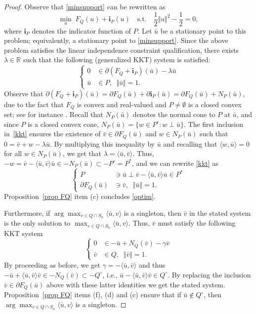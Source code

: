 \documentclass[hidelinks,onefignum,onetabnum]{siamart250211}
\theoremstyle{definition}
\theoremstyle{remark}
\newcommand{\R}{\mathbb R}
\newcommand{\bu}{\bar{u}}
\newcommand{\inner}[2]{\langle#1,#2\rangle}
\newcommand{\ind}{\mathbf{i}}
\newcommand{\norm}[1]{\textstyle{\Vert} #1 \textstyle{\Vert}}
\begin{document}
\begin{proof}
 Observe that \eqref{minsupport} can be rewritten as
\[
\min_{u } \; F_Q(u) + \ind_P(u) \quad \mbox{s.t.}\quad \frac{1}{2 }\norm{u}^2 -\displaystyle \frac{1}{2} =0,
\]
where $\ind_P$ denotes the indicator function of $P$. Let $\bu$ be a stationary point to this problem; equivalently, a stationary point to \eqref{minsupport}. Since the above problem satisfies the  linear independence constraint qualification, 
there exists $\lambda\in\R$ such that the following (generalized KKT) system is satisfied:
\begin{equation}\label{kkt}
\left\{
\begin{array}{llll}
0 & \in \partial (F_Q + \ind_P)(\bar u) - \lambda \bar u\\
\bar u & \in P,\;\; \norm{\bar u} =1.
\end{array}
\right.
\end{equation}
Observe that 
$\partial (  F_Q +\ind_P)( \bu) = \partial  F_Q(\bu) +\partial \ind_P( \bu) = \partial  F_Q(\bu) +N_P( \bu),$
due to the fact that $F_Q$ is convex and real-valued and $P\neq \emptyset$ is a closed convex set; see for instance  \cite[Corollaries 2.6 and 2.7]{WWBook}. Recall that $N_P(\bu)$ denotes the normal cone to $P$ at $\bu$, and since $P$ is a closed convex cone, $N_P( \bar u)=\{w \in P^\circ: w\perp \bar u\}$.
The first inclusion in~\eqref{kkt} ensures the existence of $\bar v \in \partial F_Q(\bar u)$ and $w \in N_P(\bar u)$ such that 
$0=\bar v + w -\lambda \bar u$. By multiplying this inequality by $\bar u$ and recalling that $\inner{w}{\bar u}=0$ for all $w \in N_P(\bar u)$, we get that $\lambda = \inner{\bar u}{\bar v}$. Thus, $-w=\bar v - \inner{\bar u}{\bar v} \bar u \in -N_P(\bar u)\subset - P^\circ = P^*$, and we can rewrite \eqref{kkt} as
\[
\left\{
\begin{array}{llll}
P&\ni \bar u \perp  \bar v  - \inner{\bar u}{\bar v} \bar u \in P^*\\
\partial F_Q(\bar u) &\ni  \bar v  ,\;\; \norm{\bar u} =1.
\end{array}
\right.
\]
Proposition~\ref{prop FQ} item (c) concludes \eqref{optim}. 

Furthermore, if $\arg\max_{v \in Q\cap S_n} \inner{\bar u}{v}$ is a singleton, then $\bar v$ in the stated system is the only  solution to $\max_{v \in Q\cap S_n} \inner{\bar u}{v}$. Thus, $\bar v$ must satisfy the following KKT system
\[
\left\{
\begin{array}{llll}
0 & \in -\bar u + N_Q(\bar v) - \gamma \bar v\\
\bar v & \in Q,\;\; \norm{\bar v} =1.
\end{array}
\right.
\]
By proceeding as before, we get $\gamma=-\inner{\bar u}{\bar v}$ and thus $-\bar u + \inner{\bar u}{\bar v}\bar v \in -N_Q(\bar v)\subset -Q^\circ$, i.e., $\bar u-\inner{\bar u}{\bar v}\bar v \in Q^\circ$. By replacing the inclusion $\bar v \in \partial F_Q(\bar u)$ above with these latter identities we get the stated system.
Proposition~\ref{prop FQ} items (f), (d) and (c) ensure that if $\bar u\not \in Q^\circ$, then $\arg\max_{v \in Q\cap S_n} \inner{\bar u}{v}$ is a singleton.
\end{proof}
\end{document}
